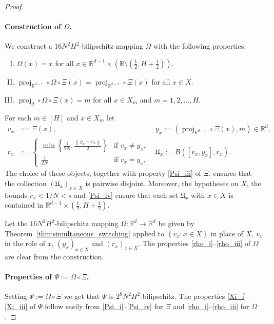 \documentclass[a4paper, bibliography=totoc]{scrartcl}
\numberwithin{claimcounter}{define}
\newcommand{\R}{\mathbb{R}}
\DeclareMathOperator{\proj}{proj}
\newcommand{\enorm}[1]{\left\|#1\right\|}
\newcommand{\mf}[1]{\mathfrak{#1}}
\newcommand{\set}[1]{\left\{#1\right\}}
\newcommand{\br}[1]{\left(#1\right)}
\begin{document}
\begin{proof}
	\paragraph{Construction of $\Omega$.} 
	We construct a $16N^{2}H^{2}$-bilipschitz mapping $\Omega$ with the following properties:
	\begin{enumerate}[(I)]
		\item\label{rho_i} $\Omega(x)=x$ for all $x\in\R^{d-1}\times \br{\R\setminus \br{\frac{1}{2},H+\frac{1}{2}}}$.
		\item\label{rho_ii} $\proj_{\R^{d-1}}\circ \Omega\circ \Xi(x)=\proj_{\R^{d-1}}\circ \Xi(x)$ for all $x\in X$.
		\item\label{rho_iii} $\proj_{d}\circ \Omega\circ \Xi(x)=m$ for all $x\in X_{m}$ and $m=1,2,\ldots,H$.
	\end{enumerate}
	For each $m\in [H]$ and $x\in X_{m}$ let 
	\begin{align*}
	v_{x}&:=\Xi(x), & y_{x}:=(\proj_{\R^{d-1}}\circ \Xi(x),m)\in \R^{d},\\
	r_{x}&:=\begin{cases}
	\min\set{\frac{1}{2N},\frac{\enorm{y_{x}-v_{x}}}{2}} & \text{if }v_x\neq y_x,\\
	\frac{1}{2N} & \text{if }v_x=y_x,
	\end{cases} & \mf{U}_{x}:=B([v_{x},y_{x}], r_{x}).
	\end{align*}
	The choice of these objects, together with property \eqref{Psi_iii} of $\Xi$, ensures that the collection $(\mf{U}_{x})_{x\in X}$ is pairwise disjoint. Moreover, the hypotheses on $X$, the bounds $r_{x}<1/N<s$ and \eqref{Psi_iv} ensure that each set $\mf{U}_{x}$ with $x\in X$ is contained in $\R^{d-1}\times \br{\frac{1}{2},H+\frac{1}{2}}$. 
	
	
	Let the $16N^{2}H^{2}$-bilipschitz mapping $\Omega\colon \R^{d}\to \R^{d}$ be given by Theorem~\ref{thm:simultaneous_switching} applied to $\set{v_{x}\colon x\in X}$ in place of $X$, $v_{x}$ in the role of $x$, $(y_{x})_{x\in X}$ and $(r_{x})_{x\in X}$. The properties \eqref{rho_i}--\eqref{rho_iii} of $\Omega$ are clear from the construction. 
	\paragraph{Properties of $\Psi:=\Omega\circ \Xi$.}
	Setting $\Psi:=\Omega\circ \Xi$ we get that $\Psi$ is $2^{8}N^{2}H^{2}$-bilipschitz. The properties \eqref{Xi_i}--\eqref{Xi_iii} of $\Psi$ follow easily from \eqref{Psi_i}--\eqref{Psi_iv} for $\Xi$ and \eqref{rho_i}--\eqref{rho_iii} for $\Omega$.
\end{proof}
\end{document}
